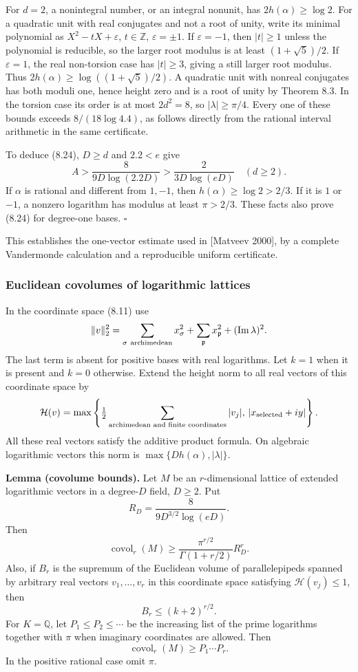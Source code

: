 \documentclass[
  11pt,
  a4paper,
]{article}
\begin{document}
For \(d=2\), a nonintegral number, or an integral nonunit, has
\(2h(\alpha)\ge\log2\). For a quadratic unit with real conjugates and
not a root of unity, write its minimal polynomial as
\(X^2-tX+\varepsilon\), \(t\in\mathbb Z\), \(\varepsilon=\pm1\). If
\(\varepsilon=-1\), then \(|t|\ge1\) unless the polynomial is reducible,
so the larger root modulus is at least \((1+\sqrt5)/2\). If
\(\varepsilon=1\), the real non-torsion case has \(|t|\ge3\), giving a
still larger root modulus. Thus \(2h(\alpha)\ge\log((1+\sqrt5)/2)\). A
quadratic unit with nonreal conjugates has both moduli one, hence height
zero and is a root of unity by Theorem 8.3. In the torsion case its
order is at most \(2d^2=8\), so \(|\lambda|\ge\pi/4\). Every one of
these bounds exceeds \(8/(18\log4.4)\), as follows directly from the
rational interval arithmetic in the same certificate.

To deduce (8.24), \(D\ge d\) and \(2.2<e\) give \[
A>\frac8{9D\log(2.2D)}
>\frac2{3D\log(eD)}
\quad(d\ge2).
\] If \(\alpha\) is rational and different from \(1,-1\), then
\(h(\alpha)\ge\log2>2/3\). If it is \(1\) or \(-1\), a nonzero logarithm
has modulus at least \(\pi>2/3\). These facts also prove (8.24) for
degree-one bases. \(\square\)

This establishes the one-vector estimate used in {[}Matveev 2000{]}, by
a complete Vandermonde calculation and a reproducible uniform
certificate.

\subsubsection{Euclidean covolumes of logarithmic
lattices}\label{euclidean-covolumes-of-logarithmic-lattices}

In the coordinate space (8.11) use \[
\|v\|_2^2=\sum_{\sigma\ {\rm archimedean}}x_\sigma^2
+\sum_{\mathfrak p}x_{\mathfrak p}^2
+(\operatorname{Im}\lambda)^2.
\] The last term is absent for positive bases with real logarithms. Let
\(k=1\) when it is present and \(k=0\) otherwise. Extend the height norm
to all real vectors of this coordinate space by \[
\mathcal H(v)=
\max\left\{\tfrac12\sum_{\text{archimedean and finite coordinates}}|v_j|,
\,|x_{\rm selected}+i y|\right\}.
\] All these real vectors satisfy the additive product formula. On
algebraic logarithmic vectors this norm is
\(\max\{D h(\alpha),|\lambda|\}\).

\textbf{Lemma (covolume bounds).} Let \(M\) be an \(r\)-dimensional
lattice of extended logarithmic vectors in a degree-\(D\) field,
\(D\ge2\). Put \[
R_D=\frac8{9D^{3/2}\log(eD)}.
\] Then \[
\operatorname{covol}_r(M)\ge
\frac{\pi^{r/2}}{\Gamma(1+r/2)}R_D^r.
\tag{8.28}
\] Also, if \(B_r\) is the supremum of the Euclidean volume of
parallelepipeds spanned by arbitrary real vectors \(v_1,\ldots,v_r\) in
this coordinate space satisfying \(\mathcal H(v_j)\le1\), then \[
B_r\le(k+2)^{r/2}.
\tag{8.29}
\] For \(K=\mathbb Q\), let \(P_1\le P_2\le\cdots\) be the increasing
list of the prime logarithms together with \(\pi\) when imaginary
coordinates are allowed. Then \[
\operatorname{covol}_r(M)\ge P_1\cdots P_r.
\tag{8.30}
\] In the positive rational case omit \(\pi\).
\end{document}
